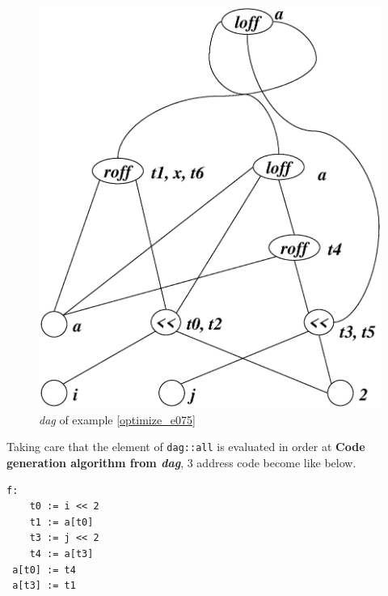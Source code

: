 \begin{Example}
\begin{figure}[htbp]
\begin{center}
\begin{latexonly}
\includegraphics[width=1.0\linewidth,height=1.069\linewidth]{opt031.eps}
\end{latexonly}
\caption{{\em dag} of example \ref{optimize_e075}}
\label{optimize_e076}
\end{center}
\end{figure}
Taking care that the element of {\tt{dag::all}}
is evaluated in order at
{\bf Code generation algorithm from {\em dag}},
3 address code become like below.
\begin{verbatim}
f:
    t0 := i << 2
    t1 := a[t0]
    t3 := j << 2
    t4 := a[t3]
 a[t0] := t4
 a[t3] := t1
\end{verbatim}
\end{Example}

